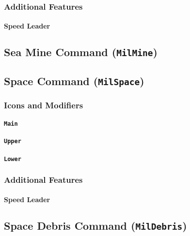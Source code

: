 \documentclass[a4paper, titlepage]{article}
\begin{document}
\subsubsection{Additional Features}

\paragraph{Speed Leader}

\subsection{Sea Mine Command (\textbf{\texttt{MilMine}})}

\subsection{Space Command (\textbf{\texttt{MilSpace}})}

\subsubsection{Icons and Modifiers}

\paragraph{\texttt{Main}}
%

\paragraph{\texttt{Upper}}
%

\paragraph{\texttt{Lower}}
%

\subsubsection{Additional Features}

\paragraph{Speed Leader}

\subsection{Space Debris Command (\textbf{\texttt{MilDebris}})}
\end{document}
